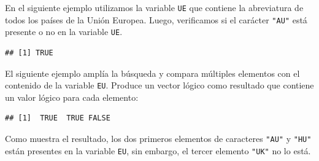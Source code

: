 \documentclass[
]{book}
\newenvironment{Shaded}{\begin{snugshade}}{\end{snugshade}}
\newcommand{\KeywordTok}[1]{\textcolor[rgb]{0.13,0.29,0.53}{\textbf{#1}}}
\newcommand{\NormalTok}[1]{#1}
\newcommand{\OperatorTok}[1]{\textcolor[rgb]{0.81,0.36,0.00}{\textbf{#1}}}
\newcommand{\StringTok}[1]{\textcolor[rgb]{0.31,0.60,0.02}{#1}}
\begin{document}
En el siguiente ejemplo utilizamos la variable \texttt{UE} que contiene la abreviatura de todos los países de la Unión Europea. Luego, verificamos si el carácter \texttt{"AU"} está presente o no en la variable \texttt{UE}.

\begin{Shaded}
\end{Shaded}

\begin{verbatim}
## [1] TRUE
\end{verbatim}

El siguiente ejemplo amplía la búsqueda y compara múltiples elementos con el contenido de la variable \texttt{EU}. Produce un vector lógico como resultado que contiene un valor lógico para cada elemento:

\begin{Shaded}
\end{Shaded}

\begin{verbatim}
## [1]  TRUE  TRUE FALSE
\end{verbatim}

Como muestra el resultado, los dos primeros elementos de caracteres \texttt{"AU"} y \texttt{"HU"} están presentes en la variable \texttt{EU}, sin embargo, el tercer elemento \texttt{"UK"} no lo está.
\end{document}
